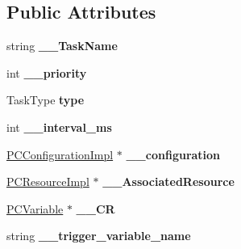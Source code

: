 \subsection*{Public Attributes}
\begin{DoxyCompactItemize}
\item 
string {\bfseries \+\_\+\+\_\+\+Task\+Name}\hypertarget{classpc__emulator_1_1Task_ae659eede17f37cc8336a3884b206c765}{}\label{classpc__emulator_1_1Task_ae659eede17f37cc8336a3884b206c765}

\item 
int {\bfseries \+\_\+\+\_\+priority}\hypertarget{classpc__emulator_1_1Task_aad766fc8627db19432089f1bcd9ff0fc}{}\label{classpc__emulator_1_1Task_aad766fc8627db19432089f1bcd9ff0fc}

\item 
Task\+Type {\bfseries type}\hypertarget{classpc__emulator_1_1Task_ad86892b4819c15f08fccf22b139236d3}{}\label{classpc__emulator_1_1Task_ad86892b4819c15f08fccf22b139236d3}

\item 
int {\bfseries \+\_\+\+\_\+interval\+\_\+ms}\hypertarget{classpc__emulator_1_1Task_a261375b14a8fd7c1befdbf733750d253}{}\label{classpc__emulator_1_1Task_a261375b14a8fd7c1befdbf733750d253}

\item 
\hyperlink{classpc__emulator_1_1PCConfigurationImpl}{P\+C\+Configuration\+Impl} $\ast$ {\bfseries \+\_\+\+\_\+configuration}\hypertarget{classpc__emulator_1_1Task_adc25e243386c88f3939b1ec38fb84e12}{}\label{classpc__emulator_1_1Task_adc25e243386c88f3939b1ec38fb84e12}

\item 
\hyperlink{classpc__emulator_1_1PCResourceImpl}{P\+C\+Resource\+Impl} $\ast$ {\bfseries \+\_\+\+\_\+\+Associated\+Resource}\hypertarget{classpc__emulator_1_1Task_a7ece4d62e9640ec475988b6c2ad0e7e0}{}\label{classpc__emulator_1_1Task_a7ece4d62e9640ec475988b6c2ad0e7e0}

\item 
\hyperlink{classpc__emulator_1_1PCVariable}{P\+C\+Variable} $\ast$ {\bfseries \+\_\+\+\_\+\+CR}\hypertarget{classpc__emulator_1_1Task_a521a83be8340451a7f6ed9f0d3944e79}{}\label{classpc__emulator_1_1Task_a521a83be8340451a7f6ed9f0d3944e79}

\item 
string {\bfseries \+\_\+\+\_\+trigger\+\_\+variable\+\_\+name}\hypertarget{classpc__emulator_1_1Task_a867ac3aa2ce1a9831309dc480ac6c23b}{}\label{classpc__emulator_1_1Task_a867ac3aa2ce1a9831309dc480ac6c23b}


\end{DoxyCompactItemize}
